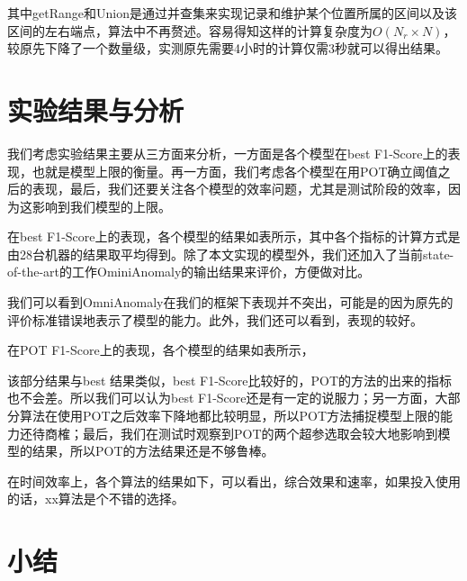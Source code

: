   其中getRange和Union是通过并查集来实现记录和维护某个位置所属的区间以及该区间的左右端点，算法中不再赘述。容易得知这样的计算复杂度为$O(N_r\times N)$，较原先下降了一个数量级，实测原先需要4小时的计算仅需3秒就可以得出结果。
\section{实验结果与分析}
我们考虑实验结果主要从三方面来分析，一方面是各个模型在best F1-Score上的表现，也就是模型上限的衡量。再一方面，我们考虑各个模型在用POT确立阈值之后的表现，最后，我们还要关注各个模型的效率问题，尤其是测试阶段的效率，因为这影响到我们模型的上限。

在best F1-Score上的表现，各个模型的结果如表所示，其中各个指标的计算方式是由28台机器的结果取平均得到。除了本文实现的模型外，我们还加入了当前state-of-the-art的工作OminiAnomaly\cite{su2019robust}的输出结果来评价，方便做对比。

我们可以看到OmniAnomaly在我们的框架下表现并不突出，可能是的因为原先的评价标准错误地表示了模型的能力。此外，我们还可以看到，表现的较好。

在POT F1-Score上的表现，各个模型的结果如表所示，

该部分结果与best 结果类似，best F1-Score比较好的，POT的方法的出来的指标也不会差。所以我们可以认为best F1-Score还是有一定的说服力；另一方面，大部分算法在使用POT之后效率下降地都比较明显，所以POT方法捕捉模型上限的能力还待商榷；最后，我们在测试时观察到POT的两个超参选取会较大地影响到模型的结果，所以POT的方法结果还是不够鲁棒。

在时间效率上，各个算法的结果如下，可以看出，综合效果和速率，如果投入使用的话，xx算法是个不错的选择。

\section{小结}



